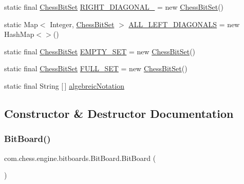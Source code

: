 \begin{DoxyCompactItemize}
\item 
static final \mbox{\hyperlink{classcom_1_1chess_1_1engine_1_1bitboards_1_1_chess_bit_set}{Chess\+Bit\+Set}} \mbox{\hyperlink{classcom_1_1chess_1_1engine_1_1bitboards_1_1_bit_board_aa52061b74a98e0b34fb8fdfc399ac10a}{R\+I\+G\+H\+T\+\_\+\+D\+I\+A\+G\+O\+N\+A\+L\+\_}} = new \mbox{\hyperlink{classcom_1_1chess_1_1engine_1_1bitboards_1_1_chess_bit_set}{Chess\+Bit\+Set}}()
\item 
static Map$<$ Integer, \mbox{\hyperlink{classcom_1_1chess_1_1engine_1_1bitboards_1_1_chess_bit_set}{Chess\+Bit\+Set}} $>$ \mbox{\hyperlink{classcom_1_1chess_1_1engine_1_1bitboards_1_1_bit_board_a38ff11d8fc85429173b97f2b79491713}{A\+L\+L\+\_\+\+L\+E\+F\+T\+\_\+\+D\+I\+A\+G\+O\+N\+A\+LS}} = new Hash\+Map$<$$>$()
\item 
static final \mbox{\hyperlink{classcom_1_1chess_1_1engine_1_1bitboards_1_1_chess_bit_set}{Chess\+Bit\+Set}} \mbox{\hyperlink{classcom_1_1chess_1_1engine_1_1bitboards_1_1_bit_board_a926322af54a20b9fd2bcdaf5b179222e}{E\+M\+P\+T\+Y\+\_\+\+S\+ET}} = new \mbox{\hyperlink{classcom_1_1chess_1_1engine_1_1bitboards_1_1_chess_bit_set}{Chess\+Bit\+Set}}()
\item 
static final \mbox{\hyperlink{classcom_1_1chess_1_1engine_1_1bitboards_1_1_chess_bit_set}{Chess\+Bit\+Set}} \mbox{\hyperlink{classcom_1_1chess_1_1engine_1_1bitboards_1_1_bit_board_ae91d0a05b44cc7159022db2510a0e37a}{F\+U\+L\+L\+\_\+\+S\+ET}} = new \mbox{\hyperlink{classcom_1_1chess_1_1engine_1_1bitboards_1_1_chess_bit_set}{Chess\+Bit\+Set}}()
\item 
static final String \mbox{[}$\,$\mbox{]} \mbox{\hyperlink{classcom_1_1chess_1_1engine_1_1bitboards_1_1_bit_board_a298f0130c0d20dd5f59ec6543bf29f28}{algebreic\+Notation}}
\end{DoxyCompactItemize}


\subsection{Constructor \& Destructor Documentation}
\mbox{\label{classcom_1_1chess_1_1engine_1_1bitboards_1_1_bit_board_afb76f345ee988535cb0b891fa90df3c0}} 
\subsubsection{\texorpdfstring{BitBoard()}{BitBoard()}}
{\footnotesize\ttfamily com.\+chess.\+engine.\+bitboards.\+Bit\+Board.\+Bit\+Board (\begin{DoxyParamCaption}{ }\end{DoxyParamCaption})}



